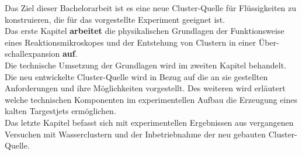 Das Ziel dieser Bachelorarbeit ist es eine neue Cluster-Quelle für Flüssigkeiten zu konstruieren, die für das vorgestellte Experiment geeignet ist.\\

Das erste Kapitel \textbf{arbeitet} die physikalischen Grundlagen der Funktionsweise eines Reaktionsmikroskopes und der Entstehung von Clustern in einer Über-schallexpansion \textbf{ auf}. \\
Die technische Umsetzung der Grundlagen wird im zweiten Kapitel behandelt. Die neu entwickelte Cluster-Quelle wird in Bezug auf die an sie gestellten Anforderungen und ihre Möglichkeiten vorgestellt. Des weiteren wird erläutert welche technischen Komponenten im experimentellen Aufbau die Erzeugung eines kalten Targestjets ermöglichen.\\
Das letzte Kapitel befasst sich mit experimentellen Ergebnissen aus vergangenen Versuchen mit Wasserclustern und der Inbetriebnahme der neu gebauten Cluster-Quelle.